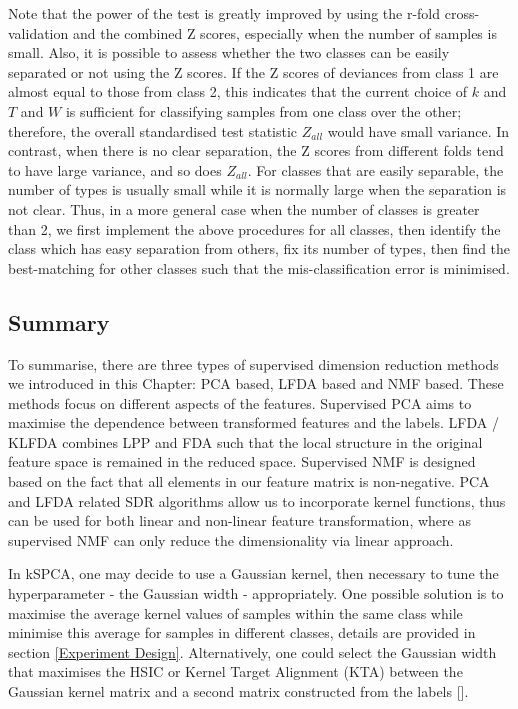 \documentclass[a4paper,12pt]{article}
\begin{document}
Note that the power of the test is greatly improved by using the r-fold cross-validation and the combined Z scores, especially when the number of samples is small. Also, it is possible to assess whether the two classes can be easily separated or not using the Z scores. If the Z scores of deviances from class 1 are almost equal to those from class 2, this indicates that the current choice of $k$ and $T$ and $W$ is sufficient for classifying samples from one class over the other; therefore, the overall standardised test statistic $Z_{a l l}$ would have small variance. In contrast, when there is no clear separation, the Z scores from different folds tend to have large variance, and so does $Z_{a l l}$. For classes that are easily separable, the number of types is usually small while it is normally large when the separation is not clear. Thus, in a more general case when the number of classes is greater than 2, we first implement the above procedures for all classes, then identify the class which has easy separation from others, fix its number of types, then find the best-matching for other classes such that the mis-classification error is minimised.  
%
%
%
\subsection{Summary}
To summarise, there are three types of supervised dimension reduction methods we introduced in this Chapter: PCA based, LFDA based and NMF based. These methods focus on different aspects of the features. Supervised PCA aims to maximise the dependence between transformed features and the labels. LFDA / KLFDA combines LPP and FDA such that the local structure in the original feature space is remained in the reduced space. Supervised NMF is designed based on the fact that all elements in our feature matrix is non-negative. PCA and LFDA related SDR algorithms allow us to incorporate kernel functions, thus can be used for both linear and non-linear feature transformation, where as supervised NMF can only reduce the dimensionality via linear approach. 

In kSPCA, one may decide to use a Gaussian kernel, then necessary to tune the  hyperparameter - the Gaussian width - appropriately. One possible solution is to maximise the average kernel values of samples within the same class while minimise this average for samples in different classes, details are provided in section \ref{Experiment Design}. Alternatively, one could select the Gaussian width that maximises the HSIC or Kernel Target Alignment (KTA) between the Gaussian kernel matrix and a second matrix constructed from the labels [\cite{damodaran2018fast}].
\end{document}
